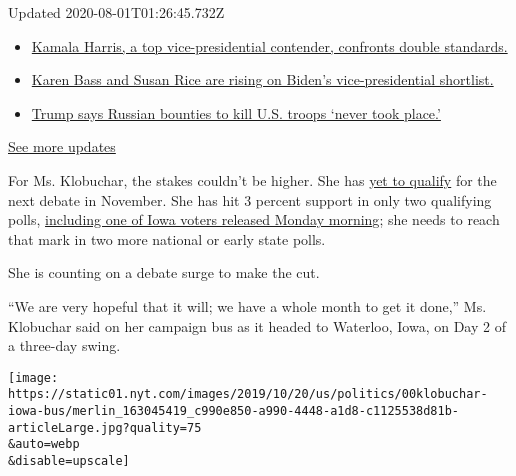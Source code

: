 Updated 2020-08-01T01:26:45.732Z

\begin{itemize}
\tightlist
\item
  \href{https://www.nytimes.com/2020/07/31/us/elections/biden-vs-trump.html?action=click\&pgtype=Article\&state=default\&region=MAIN_CONTENT_1\&context=storylines_live_updates\#link-29fdff45}{Kamala
  Harris, a top vice-presidential contender, confronts double
  standards.}
\item
  \href{https://www.nytimes.com/2020/07/31/us/elections/biden-vs-trump.html?action=click\&pgtype=Article\&state=default\&region=MAIN_CONTENT_1\&context=storylines_live_updates\#link-13ec3d9c}{Karen
  Bass and Susan Rice are rising on Biden's vice-presidential
  shortlist.}
\item
  \href{https://www.nytimes.com/2020/07/31/us/elections/biden-vs-trump.html?action=click\&pgtype=Article\&state=default\&region=MAIN_CONTENT_1\&context=storylines_live_updates\#link-49e9a016}{Trump
  says Russian bounties to kill U.S. troops `never took place.'}
\end{itemize}

\href{https://www.nytimes.com/2020/07/31/us/elections/biden-vs-trump.html?action=click\&pgtype=Article\&state=default\&region=MAIN_CONTENT_1\&context=storylines_live_updates}{See
more updates}

For Ms. Klobuchar, the stakes couldn't be higher. She has
\href{https://www.nytimes.com/interactive/2019/us/politics/democratic-debate-lineup.html}{yet
to qualify} for the next debate in November. She has hit 3 percent
support in only two qualifying polls,
\href{https://www.suffolk.edu/-/media/suffolk/documents/academics/research-at-suffolk/suprc/polls/other-states/2019/10_21_2019_marignals_pdftxt.pdf?la=en\&hash=F9C7E3EEE4E593F99F37585C0A7362D4007AE4C0}{including
one of Iowa voters released Monday morning}; she needs to reach that
mark in two more national or early state polls.

She is counting on a debate surge to make the cut.

``We are very hopeful that it will; we have a whole month to get it
done,'' Ms. Klobuchar said on her campaign bus as it headed to Waterloo,
Iowa, on Day 2 of a three-day swing.

\texttt{[image: https://static01.nyt.com/images/2019/10/20/us/politics/00klobuchar-iowa-bus/merlin\_163045419\_c990e850-a990-4448-a1d8-c1125538d81b-articleLarge.jpg?quality=75\\\&auto=webp\\\&disable=upscale]}

